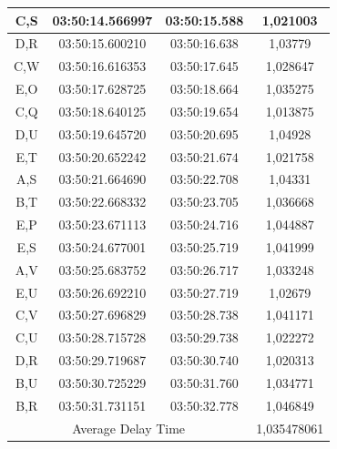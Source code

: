 \begin{longtable}{|ccc|c|}
  \multicolumn{1}{|c|}{C,S}  & \multicolumn{1}{c|}{03:50:14.566997} & 03:50:15.588       & 1,021003    \\ \hline
  \multicolumn{1}{|c|}{D,R}  & \multicolumn{1}{c|}{03:50:15.600210} & 03:50:16.638       & 1,03779     \\ \hline
  \multicolumn{1}{|c|}{C,W}  & \multicolumn{1}{c|}{03:50:16.616353} & 03:50:17.645       & 1,028647    \\ \hline
  \multicolumn{1}{|c|}{E,O}  & \multicolumn{1}{c|}{03:50:17.628725} & 03:50:18.664       & 1,035275    \\ \hline
  \multicolumn{1}{|c|}{C,Q}  & \multicolumn{1}{c|}{03:50:18.640125} & 03:50:19.654       & 1,013875    \\ \hline
  \multicolumn{1}{|c|}{D,U}  & \multicolumn{1}{c|}{03:50:19.645720} & 03:50:20.695       & 1,04928     \\ \hline
  \multicolumn{1}{|c|}{E,T}  & \multicolumn{1}{c|}{03:50:20.652242} & 03:50:21.674       & 1,021758    \\ \hline
  \multicolumn{1}{|c|}{A,S}  & \multicolumn{1}{c|}{03:50:21.664690} & 03:50:22.708       & 1,04331     \\ \hline
  \multicolumn{1}{|c|}{B,T}  & \multicolumn{1}{c|}{03:50:22.668332} & 03:50:23.705       & 1,036668    \\ \hline
  \multicolumn{1}{|c|}{E,P}  & \multicolumn{1}{c|}{03:50:23.671113} & 03:50:24.716       & 1,044887    \\ \hline
  \multicolumn{1}{|c|}{E,S}  & \multicolumn{1}{c|}{03:50:24.677001} & 03:50:25.719       & 1,041999    \\ \hline
  \multicolumn{1}{|c|}{A,V}  & \multicolumn{1}{c|}{03:50:25.683752} & 03:50:26.717       & 1,033248    \\ \hline
  \multicolumn{1}{|c|}{E,U}  & \multicolumn{1}{c|}{03:50:26.692210} & 03:50:27.719       & 1,02679     \\ \hline
  \multicolumn{1}{|c|}{C,V}  & \multicolumn{1}{c|}{03:50:27.696829} & 03:50:28.738       & 1,041171    \\ \hline
  \multicolumn{1}{|c|}{C,U}  & \multicolumn{1}{c|}{03:50:28.715728} & 03:50:29.738       & 1,022272    \\ \hline
  \multicolumn{1}{|c|}{D,R}  & \multicolumn{1}{c|}{03:50:29.719687} & 03:50:30.740       & 1,020313    \\ \hline
  \multicolumn{1}{|c|}{B,U}  & \multicolumn{1}{c|}{03:50:30.725229} & 03:50:31.760       & 1,034771    \\ \hline
  \multicolumn{1}{|c|}{B,R}  & \multicolumn{1}{c|}{03:50:31.731151} & 03:50:32.778       & 1,046849    \\ \hline
  \multicolumn{3}{|c|}{Average Delay Time}                                               & 1,035478061 \\ \hline
  \end{longtable}

